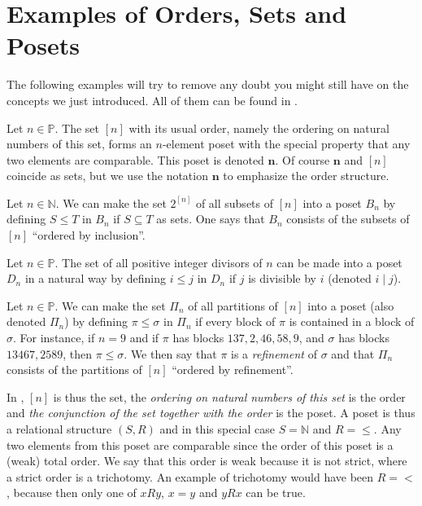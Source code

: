 \section{Examples of Orders, Sets and Posets}


The following examples will try to remove any doubt you might still have on the concepts we just introduced. All of them can be found in \cite{Stanley:2011:ECV:2124415}.




\begin{example}
\label{ex:poset:def}

\item \label{ex:poset:def:a} Let $n \in \mathbb{P}$. The set $[n]$ with its usual order, namely the ordering on natural numbers of this set, forms an $n$-element poset with the special property that any two elements are comparable. This poset is denoted $\bm{n}$. Of course $\bm{n}$ and $[n]$ coincide as sets, but we use the notation $\bm{n}$ to emphasize the order structure. 

\item \label{ex:poset:def:b} Let $n \in \mathbb{N}$. We can make the set $2^{[n]}$ of all subsets of $[n]$ into a poset $B_n$ by defining $S \leq T$ in $B_n$ if $S \subseteq T$ as sets. One says that $B_n$ consists of the subsets of $[n]$ ``ordered by inclusion''. 

\item \label{ex:poset:def:c}  Let $n \in \mathbb{P}$. The set of all positive integer divisors of $n$ can be made into a poset $D_n$ in a natural way by defining $i \leq j$ in $D_n$ if $j$ is divisible by $i$ (denoted $i \mid j$). 

\item \label{ex:poset:def:d}  Let $n \in \mathbb{P}$. We can make the set $\Pi_n$ of all partitions of $[n]$ into a poset (also denoted $\Pi_n$) by defining $\pi \leq \sigma$ in $\Pi_n$ if every block of $\pi$ is contained in a block of $\sigma$. For instance, if $n = 9$ and if $\pi$ has blocks $137, 2, 46, 58, 9$, and $\sigma$ has blocks $13467, 2589$, then $\pi \leq \sigma$. We then say that $\pi$ is a \emph{refinement} of $\sigma$ and that $\Pi_n$ consists of the partitions of $[n]$ ``ordered by refinement''. 
\end{example}


In , $[n]$ is thus the set, the \emph{ordering on natural numbers of this set} is the order and \emph{the conjunction of the set together with the order} is the poset. A poset is thus a relational structure $(S, R)$ and in this special case $S = \mathbb{N}$ and $R = \le$. Any two elements from this poset are comparable since the order of this poset is a (weak) total order. We say that this order is weak because it is not strict, where a strict order is a trichotomy. An example of trichotomy would have been $R = <$, because then only one of $x R y$, $x = y$ and $y R x$ can be true.


